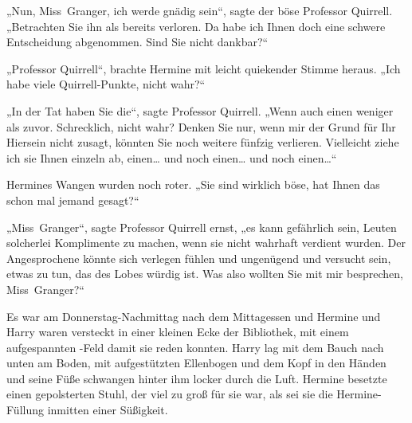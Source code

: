 „Nun, Miss~Granger, ich werde gnädig sein“, sagte der böse Professor Quirrell. „Betrachten Sie ihn als bereits verloren. Da habe ich Ihnen doch eine schwere Entscheidung abgenommen. Sind Sie nicht dankbar?“

„Professor Quirrell“, brachte Hermine mit leicht quiekender Stimme heraus. „Ich habe viele Quirrell-Punkte, nicht wahr?“

„In der Tat haben Sie die“, sagte Professor Quirrell. „Wenn auch einen weniger als zuvor. Schrecklich, nicht wahr? Denken Sie nur, wenn mir der Grund für Ihr Hiersein nicht zusagt, könnten Sie noch weitere fünfzig verlieren. Vielleicht ziehe ich sie Ihnen einzeln ab, einen… und noch einen… und noch einen…“

Hermines Wangen wurden noch roter. „Sie sind wirklich böse, hat Ihnen das schon mal jemand gesagt?“

„Miss~Granger“, sagte Professor Quirrell ernst, „es kann gefährlich sein, Leuten solcherlei Komplimente zu machen, wenn sie nicht wahrhaft verdient wurden. Der Angesprochene könnte sich verlegen fühlen und ungenügend und versucht sein, etwas zu tun, das des Lobes würdig ist. Was also wollten Sie mit mir besprechen, Miss~Granger?“

\later

Es war am Donnerstag-Nachmittag nach dem Mittagessen und Hermine und Harry waren versteckt in einer kleinen Ecke der Bibliothek, mit einem aufgespannten -Feld damit sie reden konnten. Harry lag mit dem Bauch nach unten am Boden, mit aufgestützten Ellenbogen und dem Kopf in den Händen und seine Füße schwangen hinter ihm locker durch die Luft. Hermine besetzte einen gepolsterten Stuhl, der viel zu groß für sie war, als sei sie die Hermine-Füllung inmitten einer Süßigkeit.

